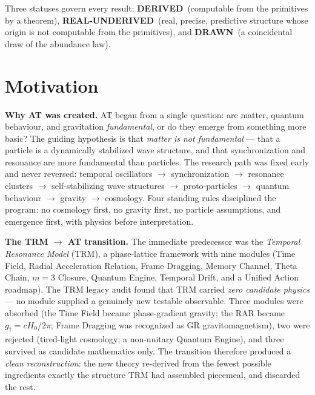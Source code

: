 \documentclass[10pt,a4paper]{article}
\newcommand{\derived}{\textbf{DERIVED}}
\newcommand{\realunder}{\textbf{REAL-UNDERIVED}}
\newcommand{\drawn}{\textbf{DRAWN}}
\begin{document}
Three statuses govern every result: \derived\ (computable from the primitives by a
theorem), \realunder\ (real, precise, predictive structure whose origin is not computable
from the primitives), and \drawn\ (a coincidental draw of the abundance law).

\section{Motivation}

\textbf{Why AT was created.} AT began from a single question: are matter, quantum
behaviour, and gravitation \emph{fundamental}, or do they emerge from something more
basic? The guiding hypothesis is that \emph{matter is not fundamental} --- that a particle
is a dynamically stabilized wave structure, and that synchronization and resonance are
more fundamental than particles. The research path was fixed early and never reversed:
temporal oscillators $\to$ synchronization $\to$ resonance clusters $\to$
self-stabilizing wave structures $\to$ proto-particles $\to$ quantum behaviour $\to$
gravity $\to$ cosmology. Four standing rules disciplined the program: no cosmology first,
no gravity first, no particle assumptions, and emergence first, with physics before
interpretation.

\textbf{The TRM $\to$ AT transition.} The immediate predecessor was the \emph{Temporal
Resonance Model} (TRM), a phase-lattice framework with nine modules (Time Field, Radial
Acceleration Relation, Frame Dragging, Memory Channel, Theta Chain, $m=3$ Closure, Quantum
Engine, Temporal Drift, and a Unified Action roadmap). The TRM legacy audit found that TRM
carried \emph{zero candidate physics} --- no module supplied a genuinely new testable
observable. Three modules were absorbed (the Time Field became phase-gradient gravity; the
RAR became $g_\dagger=cH_0/2\pi$; Frame Dragging was recognized as GR gravitomagnetism),
two were rejected (tired-light cosmology; a non-unitary Quantum Engine), and three survived
as candidate mathematics only. The transition therefore produced a \emph{clean
reconstruction}: the new theory re-derived from the fewest possible ingredients exactly the
structure TRM had assembled piecemeal, and discarded the rest.
\end{document}
